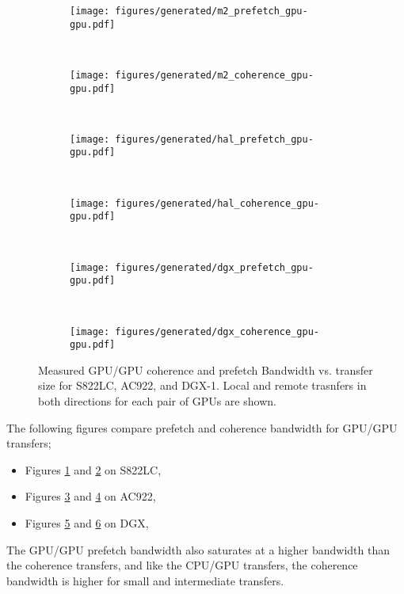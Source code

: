 \begin{figure}[ht]
	\centering
	\begin{subfigure}[b]{0.45\textwidth}
		\texttt{[image: figures/generated/m2\_prefetch\_gpu-gpu.pdf]}
		\caption{}
		\label{fig:um-prefetch-s822lc-gpu-gpu}
	\end{subfigure}
	~
	\begin{subfigure}[b]{0.45\textwidth}
		\texttt{[image: figures/generated/m2\_coherence\_gpu-gpu.pdf]}
		\caption{}
		\label{fig:um-coherence-s822lc-gpu-gpu}
	\end{subfigure}
	\\
	\begin{subfigure}[b]{0.45\textwidth}
		\texttt{[image: figures/generated/hal\_prefetch\_gpu-gpu.pdf]}
		\caption{}
		\label{fig:um-prefetch-ac922-gpu-gpu}
	\end{subfigure}
	~
	\begin{subfigure}[b]{0.45\textwidth}
		\texttt{[image: figures/generated/hal\_coherence\_gpu-gpu.pdf]}
		\caption{}
		\label{fig:um-coherence-ac922-gpu-gpu}
	\end{subfigure}
	\\
	\begin{subfigure}[b]{0.45\textwidth}
		\texttt{[image: figures/generated/dgx\_prefetch\_gpu-gpu.pdf]}
		\caption{}
		\label{fig:um-prefetch-dgx-gpu-gpu}
	\end{subfigure}
	~
	\begin{subfigure}[b]{0.45\textwidth}
		\texttt{[image: figures/generated/dgx\_coherence\_gpu-gpu.pdf]}
		\caption{}
		\label{fig:um-coherence-dgx-gpu-gpu}
	\end{subfigure}
	\caption[GPU/GPU Coherence and Prefetch Bandwidth]{
		Measured GPU/GPU coherence and prefetch Bandwidth vs. transfer size for S822LC, AC922, and DGX-1.
		Local and remote trasnfers in both directions for each pair of GPUs are shown.
	}
	\label{fig:um-gpu-gpu}
\end{figure}


The following figures compare prefetch and coherence bandwidth for GPU/GPU transfers;
\begin{itemize}
	\item Figures \ref{fig:um-prefetch-s822lc-gpu-gpu} and \ref{fig:um-coherence-s822lc-gpu-gpu} on S822LC,
	\item Figures \ref{fig:um-prefetch-ac922-gpu-gpu} and \ref{fig:um-coherence-ac922-gpu-gpu}   on AC922,
	\item Figures \ref{fig:um-prefetch-dgx-gpu-gpu} and \ref{fig:um-coherence-dgx-gpu-gpu}       on DGX,
\end{itemize}
The GPU/GPU prefetch bandwidth also saturates at a higher bandwidth than the coherence transfers, and like the CPU/GPU transfers, the coherence bandwidth is higher for small and intermediate transfers.

